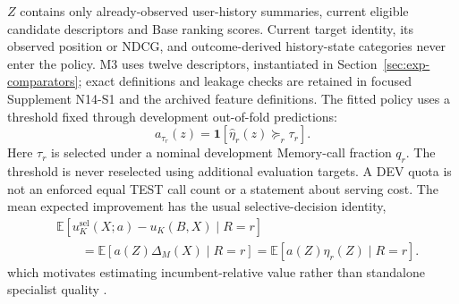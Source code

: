 \documentclass[preprint,12pt]{elsarticle}
\begin{document}
$Z$ contains only already-observed user-history summaries, current eligible candidate descriptors and Base ranking scores. Current target identity, its observed position or NDCG, and outcome-derived history-state categories never enter the policy. M3 uses twelve descriptors, instantiated in Section~\ref{sec:exp-comparators}; exact definitions and leakage checks are retained in focused Supplement N14-S1 and the archived feature definitions. The fitted policy uses a threshold fixed through development out-of-fold predictions:
\begin{equation}
    a_{\tau_r}(z)=\mathbf{1}\!\left[
    \hat{\eta}_r(z)\mathrel{\succeq_r}\tau_r
    \right].
    \label{eq:utility-threshold}
\end{equation}
Here $\tau_r$ is selected under a nominal development Memory-call fraction $q_r$. The threshold is never reselected using additional evaluation targets. A DEV quota is not an enforced equal TEST call count or a statement about serving cost. The mean expected improvement has the usual selective-decision identity,
\begin{align}
    &\mathbb{E}\!\left[u_K^{\mathrm{sel}}(X;a)-u_K(B,X)\mid R=r\right] \\
    &\qquad=\mathbb{E}\!\left[a(Z)\Delta_M(X)\mid R=r\right]
    =\mathbb{E}\!\left[a(Z)\eta_r(Z)\mid R=r\right].
    \label{eq:expected-selective-gain}
\end{align}
which motivates estimating incumbent-relative value rather than standalone specialist quality \cite{mozannar2020defer,narasimhan2022posthoc}.
\end{document}
